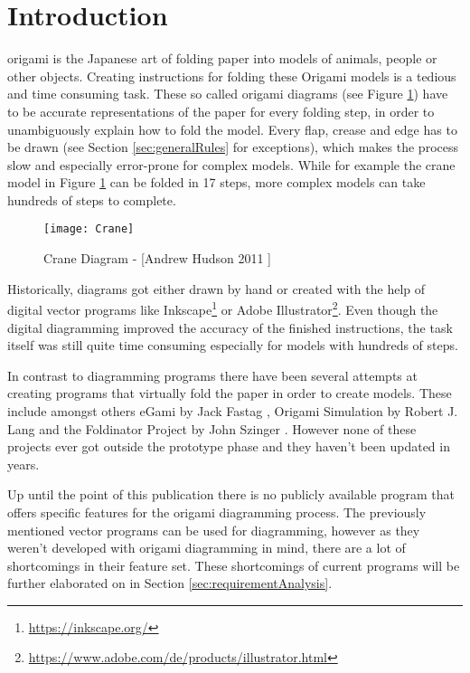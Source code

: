 
\section{Introduction}
\label{sec:introduction}

\gls{origami} is the Japanese art of folding paper into models of animals, people or other objects. Creating instructions for folding these Origami models is a tedious and time consuming task. These so called origami diagrams (see Figure \ref{fig:craneDiagram}) have to be accurate representations of the paper for every folding step, in order to unambiguously explain how to fold the model. Every flap, crease and edge has to be drawn (see Section \ref{sec:generalRules} for exceptions), which makes the process slow and especially error-prone for complex models. While for example the crane model in Figure \ref{fig:craneDiagram} can be folded in 17 steps, more complex models can take hundreds of steps to complete.
\begin{figure}[htbp]
	\centering
	\texttt{[image: Crane]}
	\caption[Crane Diagram]{Crane Diagram - [Andrew Hudson 2011 \cite{Hudson}]}
	\label{fig:craneDiagram}
\end{figure}

\noindent Historically, diagrams got either drawn by hand or created with the help of digital vector programs like Inkscape\footnote{\url{https://inkscape.org/}} or Adobe Illustrator\footnote{\url{https://www.adobe.com/de/products/illustrator.html}}. Even though the digital diagramming improved the accuracy of the finished instructions, the task itself was still quite time consuming especially for models with hundreds of steps.

In contrast to diagramming programs there have been several attempts at creating programs that virtually fold the paper in order to create models. These include amongst others eGami by Jack Fastag \cite{eGami}, Origami Simulation by Robert J. Lang \cite{origamiSimulation} and the Foldinator Project by John Szinger \cite{foldinator}. However none of these projects ever got outside the prototype phase and they haven't been updated in years.

Up until the point of this publication there is no publicly available program that offers specific features for the origami diagramming process. The previously mentioned vector programs can be used for diagramming, however as they weren't developed with origami diagramming in mind, there are a lot of shortcomings in their feature set. These shortcomings of current programs will be further elaborated on in Section \ref{sec:requirementAnalysis}.


